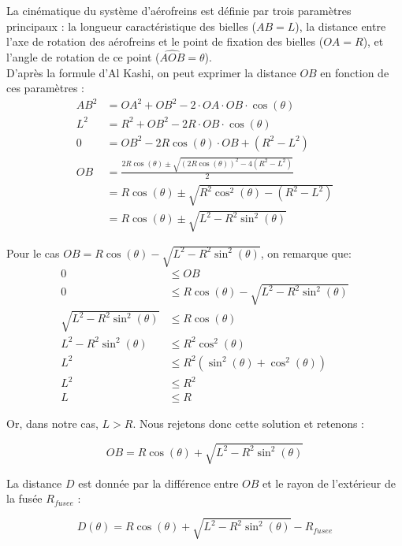\newpage

La cinématique du système d'aérofreins est définie par trois paramètres principaux : la longueur caractéristique des bielles
($AB = L$), la distance entre l'axe de rotation des aérofreins et le point de fixation des bielles ($OA = R$), et l'angle de
rotation de ce point ($\widehat{AOB}=\theta$).\\

D'après la formule d'Al Kashi, on peut exprimer la distance $OB$ en fonction de ces paramètres :
\begin{align}
    AB^2    &= OA^2 + OB^2 - 2 \cdot OA \cdot OB \cdot \cos(\theta) \\
    L^2     &= R^2 + OB^2 - 2 R \cdot OB \cdot \cos(\theta) \\
    0       &= OB^2 - 2 R \cos(\theta) \cdot OB + (R^2 - L^2) \\
    OB      &= \frac{2 R \cos(\theta) \pm \sqrt{(2 R \cos(\theta))^2 - 4 (R^2 - L^2)}}{2} \\
            &= R \cos(\theta) \pm \sqrt{R^2 \cos^2(\theta) - (R^2 - L^2)} \\
            &= R \cos(\theta) \pm \sqrt{L^2 - R^2 \sin^2(\theta)}
\end{align}

Pour le cas $OB = R \cos(\theta) - \sqrt{L^2 - R^2 \sin^2(\theta)}$, on remarque que:
\begin{align}
    0 &\leq OB\\
    0 &\leq R \cos(\theta) - \sqrt{L^2 - R^2 \sin^2(\theta)}\\
    \sqrt{L^2 - R^2 \sin^2(\theta)} &\leq R \cos(\theta) \\
    L^2 - R^2 \sin^2(\theta) &\leq R^2 \cos^2(\theta) \\
    L^2 &\leq R^2 (\sin^2(\theta) + \cos^2(\theta)) \\
    L^2 &\leq R^2 \\
    L &\leq R
\end{align}

Or, dans notre cas, $L > R$. Nous rejetons donc cette solution et retenons :

\begin{equation}
    OB = R \cos(\theta) + \sqrt{L^2 - R^2 \sin^2(\theta)}
\end{equation}

La distance $D$ est donnée par la différence entre $OB$ et le rayon de l'extérieur de la fusée $R_{fusee}$ :

\begin{equation}
    D(\theta) = R \cos(\theta) + \sqrt{L^2 - R^2 \sin^2(\theta)} - R_{fusee}
\end{equation}

